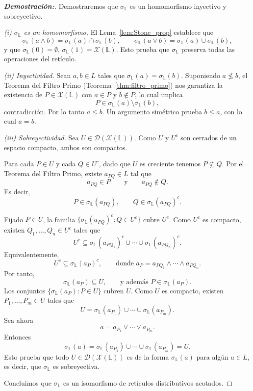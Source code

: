 \documentclass[12pt]{book}
\begin{document}
\begin{proof}[{\textbf{Demostración:}}]
Demostraremos que $\sigma_{\mathbb{L}}$ es un homomorfismo inyectivo y sobreyectivo.

\smallskip
\noindent\emph{(i) $\sigma_{\mathbb{L}}$ es un homomorfismo.}  
El Lema~\ref{lem:Stone_prop} establece que
\[
\sigma_{\mathbb{L}}(a\wedge b)=\sigma_{\mathbb{L}}(a)\cap\sigma_{\mathbb{L}}(b),
\qquad
\sigma_{\mathbb{L}}(a\vee b)=\sigma_{\mathbb{L}}(a)\cup\sigma_{\mathbb{L}}(b),
\]
y que $\sigma_{\mathbb{L}}(0)=\emptyset$, $\sigma_{\mathbb{L}}(1)=\mathcal{X}(\mathbb{L})$.
Esto prueba que $\sigma_{\mathbb{L}}$ preserva todas las operaciones del retículo.

\smallskip
\noindent\emph{(ii) Inyectividad.}  
Sean $a,b\in L$ tales que $\sigma_{\mathbb{L}}(a)=\sigma_{\mathbb{L}}(b)$.
Suponiendo $a\nleq b$, el Teorema del Filtro Primo
(Teorema~\ref{thm:filtro_primo}) nos garantiza la existencia de
$P\in\mathcal{X}(\mathbb{L})$ con $a\in P$ y $b\notin P$,
lo cual implica
\[
P\in\sigma_{\mathbb{L}}(a)\setminus\sigma_{\mathbb{L}}(b),
\]
contradicción.
Por lo tanto $a\leq b$. Un argumento simétrico prueba $b\leq a$, con lo cual $a=b$.

\smallskip

\noindent\emph{(iii) Sobreyectividad.}  
Sea $U\in\mathcal{D}(\mathcal{X}(\mathbb{L}))$.
Como $U$ y $U^{c}$ son cerrados de un espacio compacto, ambos son compactos.

Para cada $P\in U$ y cada $Q\in U^{c}$, dado que $U$ es creciente tenemos
$P\nsubseteq Q$. Por el Teorema del Filtro Primo, existe $a_{PQ}\in L$ tal que
\[
a_{PQ}\in P
\qquad\text{y}\qquad
a_{PQ}\notin Q.
\]
Es decir,
\[
P\in\sigma_{\mathbb L}(a_{PQ}),
\qquad
Q\in\sigma_{\mathbb L}(a_{PQ})^{c}.
\]

Fijado $P\in U$, la familia
$\{\sigma_{\mathbb L}(a_{PQ})^{c}:Q\in U^{c}\}$
cubre $U^{c}$.  
Como $U^{c}$ es compacto, existen $Q_{1},\dots,Q_{n}\in U^{c}$ tales que
\[
U^{c}\subseteq \sigma_{\mathbb L}(a_{PQ_{1}})^{c}\cup\cdots\cup
               \sigma_{\mathbb L}(a_{PQ_{n}})^{c}.
\]
Equivalentemente,
\[
U^{c}\subseteq 
\sigma_{\mathbb L}(a_{P})^{c},
\qquad
\text{donde } 
a_{P}=a_{PQ_{1}}\wedge\cdots\wedge a_{PQ_{n}}.
\]
Por tanto,
\[
\sigma_{\mathbb L}(a_{P})\subseteq U,
\qquad\text{y además } P\in\sigma_{\mathbb L}(a_{P}).
\]
Los conjuntos $\{\sigma_{\mathbb L}(a_{P}):P\in U\}$ cubren $U$.  
Como $U$ es compacto, existen $P_{1},\dots,P_{m}\in U$ tales que
\[
U=\sigma_{\mathbb L}(a_{P_{1}})\cup\cdots\cup\sigma_{\mathbb L}(a_{P_{m}}).
\]
Sea ahora
\[
a=a_{P_{1}}\vee\cdots\vee a_{P_{m}}.
\]
Entonces
\[
\sigma_{\mathbb L}(a)
=\sigma_{\mathbb L}(a_{P_{1}})\cup\cdots\cup\sigma_{\mathbb L}(a_{P_{m}})
=U.
\]
Esto prueba que todo $U\in\mathcal{D}(\mathcal{X}(\mathbb{L}))$ es de la forma $\sigma_{\mathbb L}(a)$ para algún $a\in L$, es decir, que 
$\sigma_{\mathbb L}$ es sobreyectiva.


\smallskip

Concluimos que $\sigma_{\mathbb{L}}$ es un isomorfismo de retículos distributivos acotados.
\end{proof}
\end{document}
